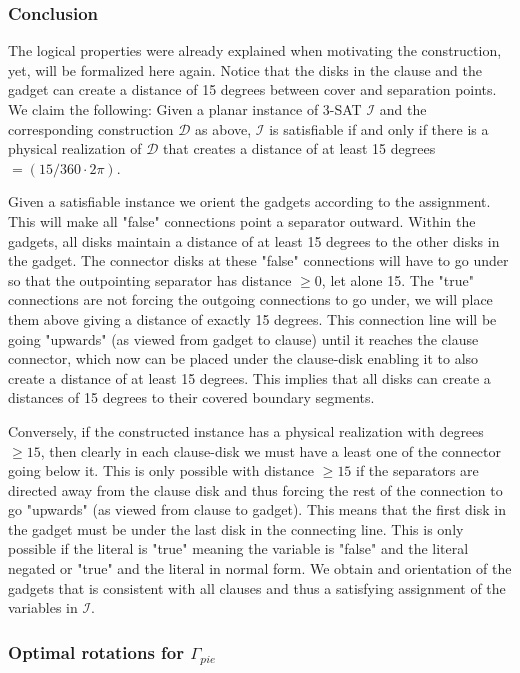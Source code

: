 \documentclass[a4paper,11pt]{article}
\begin{document}
\subsubsection*{Conclusion}
The logical properties were already explained when motivating the construction, yet, will be formalized here again. Notice that the disks in the clause and the gadget can create a distance of 15 degrees between cover and separation points. We claim the following:
Given a planar instance of 3-SAT $\mathcal{I}$ and the corresponding construction $\mathcal{D}$ as above, $\mathcal{I}$ is satisfiable if and only if there is a physical realization of $\mathcal{D}$ that creates a distance of at least 15 degrees $=(15/360\cdot 2\pi)$.

Given a satisfiable instance we orient the gadgets according to the assignment. This will make all "false" connections point a separator outward. Within the gadgets, all disks maintain a distance of at least 15 degrees to the other disks in the gadget. The connector disks at these "false" connections will have to go under so that the outpointing separator has distance $\geq 0$, let alone 15. The "true" connections are not forcing the outgoing connections to go under, we will place them above giving a distance of exactly 15 degrees. This connection line will be going "upwards" (as viewed from gadget to clause) until it reaches the clause connector, which now can be placed under the clause-disk enabling it to also create a distance of at least 15 degrees.
This implies that all disks can create a distances of 15 degrees to their covered boundary segments.

Conversely, if the constructed instance has a physical realization with degrees $\geq 15$, then clearly in each clause-disk we must have a least one of the connector going below it. This is only possible with distance $\geq 15$ if the separators are directed away from the clause disk and thus forcing the rest of the connection to go "upwards" (as viewed from clause to gadget). This means that the first disk in the gadget must be under the last disk in the connecting line. This is only possible if the literal is "true" meaning the variable is "false" and the literal negated or "true" and the literal in normal form. We obtain and orientation of the gadgets that is consistent with all clauses and thus a satisfying assignment of the variables in $\mathcal{I}$.
\begin{flushright}
\qedsymbol
\end{flushright}
\subsubsection{Optimal rotations for $\Gamma_{pie}$}
\end{document}
